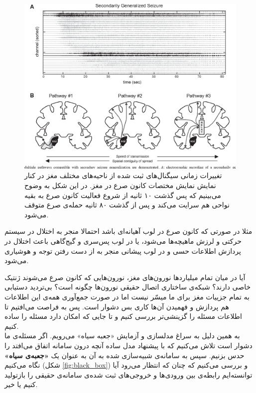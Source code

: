 \begin{figure}
	\centering
	\includegraphics[width=\textwidth]{../Figures/generalized_seizure.png}
	\caption{
		تغییرات زمانی سیگنال‌های ثبت شده از ناحیه‌های مختلف مغز در کنار نمایش نمایش مختصات کانون صرع در مغز.
		\cite{Tomlinson2017SecondaryGO}
 در این شکل به وضوح می‌بینیم که پس گذشت ۱۰ ثانیه از شروع فعالیت کانون صرع به بقیه نواحی هم سرایت می‌کند و پس از گذشت ۸۰ ثانیه حمله‌ی صرع متوقف می‌شود.
	}
\end{figure}

مثلا در صورتی که کانون صرع در لوب آهیانه‌ای 
باشد احتمالا منجر به اختلال در سیستم حرکتی و لرزش ماهیچه‌ها می‌شود، یا در لوب پس‌سری
 و گیج‌گاهی
  باعث اختلال در پردازش اطلاعات حسی و در لوب پیشانی
   منجر به از دست رفتن توجه و هوشیاری می‌شود.

آیا در میان تمام میلیاردها نورون‌های مغز، نورون‌هایی که کانون صرع می‌شوند ژنتیک خاصی دارند؟ شبکه‌ی ساختاری اتصال حقیقی نورون‌ها چگونه است؟ بی‌تردید دستیابی به تمام جزییات مغز برای ما میسّر نیست اما در صورت جمع‌آوری همه‌ی این اطلاعات هم پردازش و فهمیدن آن‌ها کاری بس دشوار است. پس به فراصت می‌افتیم تا اطلاعات مسئله را گزینشی‌تر بررسی کنیم و تا جایی که امکان دارد مسئله را ساده کنیم.\\

به همین دلیل به سراغ مدلسازی و آزمایش «جعبه سیاه» می‌رویم. اگر مسئله‌ی ما دشوار است تلاش می‌کنیم که با پیشنهاد مدل ساده‌ آنچه درون سامانه اتفاق می‌افتد را حدس بزنیم. سپس به سامانه‌ی شبیه‌سازی شده به آن به عنوان یک \textbf{«جعبه‌ی سیاه»} نگاه می‌کنیم (شکل 
\ref{fig:black_box})
 و بررسی می‌کنیم که چنان که انتظار می‌رود آیا توانسته‌ایم رابطه‌ی بین ورودی‌ها و خروجی‌های ثبت شده‌ی سامانه‌ی حقیقی را بازتولید کنیم یا خیر.\\

